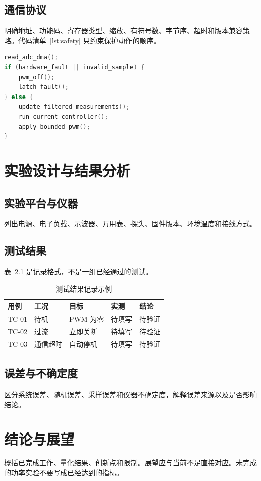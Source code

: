 \documentclass[12pt,a4paper,fontset=fandol,oneside,openany]{ctexbook}
\begin{document}
\section{通信协议}
明确地址、功能码、寄存器类型、缩放、有符号数、字节序、超时和版本兼容策略。代码清单~\ref{lst:safety} 只约束保护动作的顺序。

\begin{lstlisting}[language=C,caption={安全控制循环},label={lst:safety}]
read_adc_dma();
if (hardware_fault || invalid_sample) {
    pwm_off();
    latch_fault();
} else {
    update_filtered_measurements();
    run_current_controller();
    apply_bounded_pwm();
}
\end{lstlisting}

\chapter{实验设计与结果分析}
\section{实验平台与仪器}
列出电源、电子负载、示波器、万用表、探头、固件版本、环境温度和接线方式。

\section{测试结果}
表~\ref{tab:tests} 是记录格式，不是一组已经通过的测试。

\begin{table}[htbp]
  \centering
  \caption{测试结果记录示例}\label{tab:tests}
  \begin{tabular}{lllll}
    \toprule
    用例 & 工况 & 目标 & 实测 & 结论 \\
    \midrule
    TC-01 & 待机 & PWM 为零 & 待填写 & 待验证 \\
    TC-02 & 过流 & 立即关断 & 待填写 & 待验证 \\
    TC-03 & 通信超时 & 自动停机 & 待填写 & 待验证 \\
    \bottomrule
  \end{tabular}
\end{table}

\section{误差与不确定度}
区分系统误差、随机误差、采样误差和仪器不确定度，解释误差来源以及是否影响结论。

\chapter{结论与展望}
概括已完成工作、量化结果、创新点和限制。展望应与当前不足直接对应。未完成的功率实验不要写成已经达到的指标。
\end{document}
